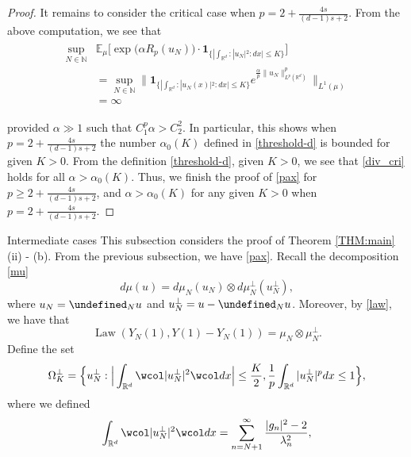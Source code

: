 \documentclass[%
11pt,  reqno]{amsart}
\makeatletter
\theoremstyle{remarkstyle}
\newcommand{\1}{\hspace{0.2mm}\text{I}\hspace{0.2mm}}
\newcommand{\noi}{\noindent}
\newcommand{\R}{\mathbb{R}}
\let\P= \undefined
\newcommand{\P}{\mathbf{P}}
\newcommand{\E}{\mathbb{E}}
\newcommand{\al}{\alpha}
\newcommand{\ld}{\lambda}
\newcommand{\wick}[1]{\wcol#1\wcol}
\renewcommand{\O}{\Omega}
\newcommand{\ind}{\mathbf 1}
\newcommand{\N}{\mathbb{N}}
\DeclareMathOperator{\Law}{Law}
\numberwithin{equation}{section}
\numberwithin{theorem}{section}
\def\subsubsection{\@startsection{subsubsection}{3}%
	\z@{.5\linespacing\@plus.7\linespacing}{-.5em}%
	{\normalfont\bfseries}}
\makeatother
\begin{document}
\begin{proof}
		It remains to consider the critical case when $p = 2+\frac{4s}{(d-1)s+2}$. 
		From the above computation, we see that 
		\begin{align} 
			\begin{split}
				\sup_{N \in \N} & \E_\mu \Big[\exp\big({  \al R_p (u_N)} \big) \cdot \ind_{\{|\int_{{\R^d}} : |u_N|^2 : dx|  \le K\}}   \Big] \\
				& = \sup_{N \in \mathbb N} \Big\|  \ind_{ \{ | \int_{\R^d} : | u_N (x)|^2 : dx | \le K\}}  e^{\frac{\al} p{\| u_N \|_{L^p (\R^d)}^p}} \Big\|_{L^1 (\mu)}  \\
				& = \infty 
			\end{split}
			\label{div_cri}
		\end{align} 
		
		\noi 
		provided $\al \gg 1$ such that $C_1^p \al > C_2^2 $.
		In particular, this shows when $ p = 2+\frac{4s}{(d-1)s+2}$ the number $\al_0 (K)$ defined in \eqref{threshold-d} is bounded for given $K >0$.
		From the definition \eqref{threshold-d}, given $K > 0$,
		we see that \eqref{div_cri} holds for all $\al > \al_0 (K)$.
		Thus, we finish the proof of \eqref{pax} for $p \ge 2+\frac{4s}{(d-1)s+2}$, and $\alpha>\alpha_0 (K)$ for any given $K >0$ when $p=2+\frac{4s}{(d-1)s+2}$.
	\end{proof}
	
	\subsubsection{Intermediate cases}
	This subsection considers the proof of Theorem \ref{THM:main} (ii) - (b).
	From the previous subsection, we have \eqref{pax}. 
	Recall the decomposition \eqref{mu} 
	$$ d \mu(u) = d \mu_N(u_N) \otimes d \mu_N^\perp(u_N^\perp), $$
	where $u_N = \P_{N} u$ and $u_N^\perp = u - \P_{N} u$. 
	Moreover, by \eqref{law}, we have that 
	$$\Law(Y_N(1), Y(1) - Y_N(1)) = \mu_N \otimes \mu_N^\perp.$$
	Define the set 
	\begin{equation}
		\O_K^\perp = \Big\{ u_N^\perp: \Big| \int_{\R^d} \wick{|u_N^\perp|^2}dx\Big| \le \frac K2, \frac 1p \int_{\R^d} |u_N^\perp|^p dx \le 1 \Big\}, \label{muperpdef}
	\end{equation}
	where we defined
	\[ 
	\int_{\R^d} \wick{|u_N^\perp|^2}dx = \sum_{n=N+1}^\infty \frac{|g_n|^2 - 2}{\ld_n^2},
	\]
	
\end{document}
